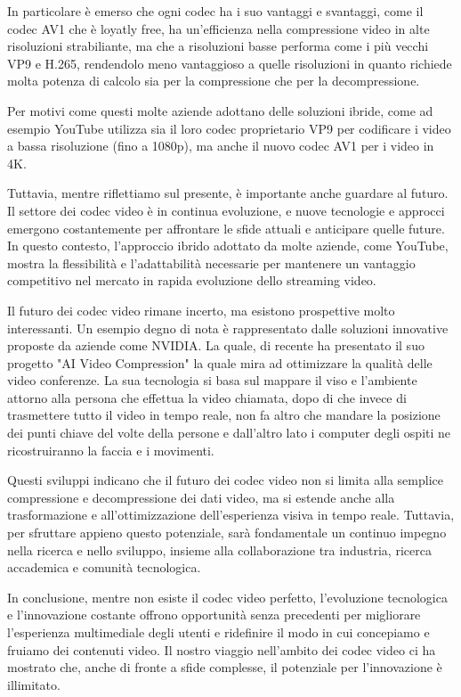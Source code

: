 \documentclass[a4paper,12pt, oneside]{article}
\begin{document}
In particolare è emerso che ogni codec ha i suo vantaggi e svantaggi, come il codec AV1 che è loyatly
free, ha un'efficienza nella compressione video in alte risoluzioni strabiliante, ma che a risoluzioni
basse performa come i più vecchi VP9 e H.265, rendendolo meno vantaggioso a quelle risoluzioni in quanto
richiede molta potenza di calcolo sia per la compressione che per la decompressione.

Per motivi come questi molte aziende adottano delle soluzioni ibride, come ad esempio YouTube utilizza
sia il loro codec proprietario VP9 per codificare i video a bassa risoluzione (fino a 1080p), ma anche
il nuovo codec AV1 per i video in 4K.

Tuttavia, mentre riflettiamo sul presente, è importante anche guardare al futuro. Il settore dei codec
video è in continua evoluzione, e nuove tecnologie e approcci emergono costantemente per affrontare le
sfide attuali e anticipare quelle future. In questo contesto, l'approccio ibrido adottato da molte aziende,
come YouTube, mostra la flessibilità e l'adattabilità necessarie per mantenere un vantaggio
competitivo nel mercato in rapida evoluzione dello streaming video.

Il futuro dei codec video rimane incerto, ma esistono prospettive molto interessanti. Un esempio degno
di nota è rappresentato dalle soluzioni innovative proposte da aziende come NVIDIA. La quale, di
recente ha presentato il suo progetto "AI Video Compression" la quale mira ad ottimizzare la qualità
delle video conferenze. La sua tecnologia si basa sul mappare il viso e l'ambiente attorno alla persona
che effettua la video chiamata, dopo di che invece di trasmettere tutto il video in tempo reale, non
fa altro che mandare la posizione dei punti chiave del volte della persone e dall'altro lato
i computer degli ospiti ne ricostruiranno la faccia e i movimenti.

Questi sviluppi indicano che il futuro dei codec video non si limita alla semplice compressione e
decompressione dei dati video, ma si estende anche alla trasformazione e all'ottimizzazione dell'esperienza
visiva in tempo reale. Tuttavia, per sfruttare appieno questo potenziale, sarà fondamentale un continuo
impegno nella ricerca e nello sviluppo, insieme alla collaborazione tra industria, ricerca accademica
e comunità tecnologica.

In conclusione, mentre non esiste il codec video perfetto, l'evoluzione tecnologica e l'innovazione
costante offrono opportunità senza precedenti per migliorare l'esperienza multimediale degli utenti
e ridefinire il modo in cui concepiamo e fruiamo dei contenuti video. Il nostro viaggio nell'ambito
dei codec video ci ha mostrato che, anche di fronte a sfide complesse, il potenziale per l'innovazione
è illimitato.
\end{document}
